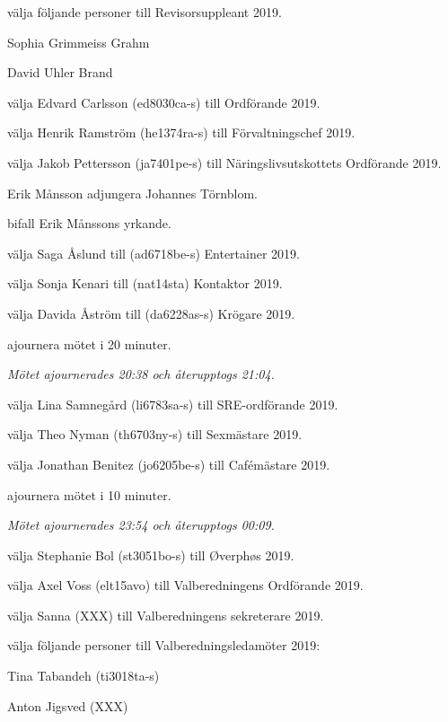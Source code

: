 \documentclass[10pt]{article}
\begin{document}
\begin{paragrafer}
\begin{paralist}
    \Mba välja följande personer till Revisorsuppleant 2019.
    \begin{tightdashlist}
        \item Sophia Grimmeiss Grahm
        \item David Uhler Brand
    \end{tightdashlist}

    \Mba välja Edvard Carlsson  (ed8030ca-s) till Ordförande 2019.

    \Mba välja Henrik Ramström (he1374ra-s) till Förvaltningschef 2019.

    \Mba välja Jakob Pettersson (ja7401pe-s) till Näringslivsutskottets Ordförande 2019.

    Erik Månsson \ypa adjungera Johannes Törnblom.

    \Mba bifall Erik Månssons yrkande.

    \Mba välja Saga Åslund till (ad6718be-s) Entertainer 2019.

    \Mba välja Sonja Kenari till (nat14sta) Kontaktor 2019.

    \Mba välja Davida Åström till (da6228as-s) Krögare 2019.
    
    \Mba ajournera mötet i 20 minuter.

    \emph{Mötet ajournerades 20:38 och återupptogs 21:04.}

    \Mba välja Lina Samnegård (li6783sa-s) till SRE-ordförande 2019.

    \Mba välja Theo Nyman (th6703ny-s) till Sexmästare 2019.

    \Mba välja Jonathan Benitez (jo6205be-s) till Cafémästare 2019.

    \Mba ajournera mötet i 10 minuter.

    \emph{Mötet ajournerades 23:54 och återupptogs 00:09.}
    
    \Mba välja Stephanie Bol (st3051bo-s) till Øverphøs 2019.
    
    
    \Mba välja Axel Voss (elt15avo) till Valberedningens Ordförande 2019.
    
    \Mba välja Sanna (XXX) till Valberedningens sekreterare 2019.
    
    \Mba välja följande personer till Valberedningsledamöter 2019:
    \begin{tightdashlist}
        \item Tina Tabandeh (ti3018ta-s)
        \item Anton Jigsved (XXX)
    \end{tightdashlist}
    

\end{paralist}
\end{paragrafer}
\end{document}
